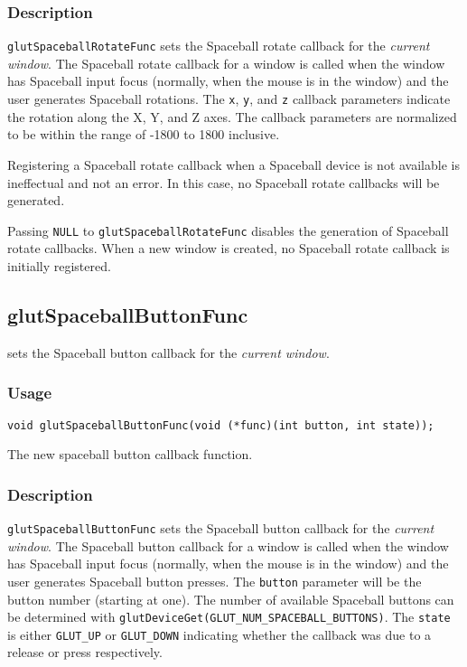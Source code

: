 \subsubsection*{Description}

{\tt glutSpaceballRotateFunc} sets the Spaceball rotate callback for the {\em
current window}.  The Spaceball rotate callback for a window is called when the
window has Spaceball input focus (normally, when the mouse is in the window)
and the user generates Spaceball rotations.  The {\tt x}, {\tt y}, and {\tt z}
callback parameters indicate the rotation along the X, Y, and Z axes.
The callback parameters are normalized to be within the range of -1800 to 1800
inclusive.

Registering a Spaceball rotate callback when a Spaceball device is not available
is ineffectual and not an error.  In this case, no Spaceball rotate callbacks
will be generated.

Passing {\tt NULL} to {\tt glutSpaceballRotateFunc} disables the generation of
Spaceball rotate callbacks.  When a new window is created, no
Spaceball rotate callback is initially registered.

\subsection{glutSpaceballButtonFunc}

 sets the Spaceball button callback for
the {\em current window}.

\subsubsection*{Usage}
\begin{verbatim}
void glutSpaceballButtonFunc(void (*func)(int button, int state));
\end{verbatim}
\begin{description}
\itemsep 0in
\item[{\tt func}]
The new spaceball button callback function.
\end{description}

\subsubsection*{Description}

{\tt glutSpaceballButtonFunc} sets the Spaceball button callback for the {\em
current window}.  The Spaceball button callback for a window is called when the
window has Spaceball input focus (normally, when the mouse is in the window)
and the user generates Spaceball button presses.  The {\tt button} parameter
will be the button number (starting at one).  The number of available Spaceball
buttons can be determined with {\tt glutDeviceGet(GLUT\_NUM\_SPACEBALL\_BUTTONS)}.
The {\tt state} is either {\tt GLUT\_UP} or {\tt GLUT\_DOWN} indicating whether
the callback was due to a release or press respectively.

